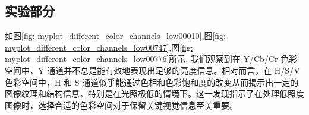 \documentclass[a4paper]{ctexart}
\begin{document}
	
	\subsection*{实验部分}
	
	如图\ref{fig: myplot_different_color_channels_low00010},图\ref{fig: myplot_different_color_channels_low00747},图\ref{fig: myplot_different_color_channels_low00776}所示, 我们观察到在 Y/Cb/Cr 色彩空间中，Y 通道并不总是能有效地表现出足够的亮度信息。相对而言，在 H/S/V 色彩空间中，H 和 S 通道似乎能通过色相和色彩饱和度的改变从而揭示出一定的图像纹理和结构信息，特别是在光照极低的情境下。这一发现指示了在处理低照度图像时，选择合适的色彩空间对于保留关键视觉信息至关重要。
	
\end{document}
